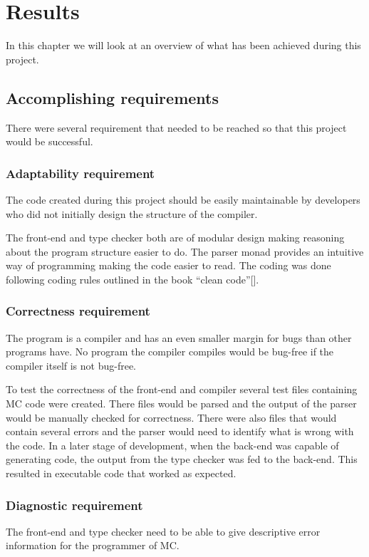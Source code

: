 \section{Results}

In this chapter we will look at an overview of what has been achieved during this project.

\subsection{Accomplishing requirements}

There were several requirement that needed to be reached so that this project would be successful.

\subsubsection{Adaptability requirement}
The code created during this project should be easily maintainable by developers who did not initially design the structure of the compiler.

The front-end and type checker both are of modular design making reasoning about the program structure easier to do. The parser monad provides an intuitive way of programming making the code easier to read. The coding was done following coding rules outlined in the book “clean code”[]. 

\subsubsection{Correctness requirement}
The program is a compiler and has an even smaller margin for bugs than other programs have. 
No program the compiler compiles would be bug-free if the compiler itself is not bug-free.

To test the correctness of the front-end and compiler several test files containing MC code were created. There files would be parsed and the output of the parser would be manually checked for correctness. There were also files that would contain several errors and the parser would need to identify what is wrong with the code.
In a later stage of development, when the back-end was capable of generating code, the output from the type checker was fed to the back-end. This resulted in executable code that worked as expected. 

\subsubsection{Diagnostic requirement}
The front-end and type checker need to be able to give descriptive error information for the programmer of MC.

